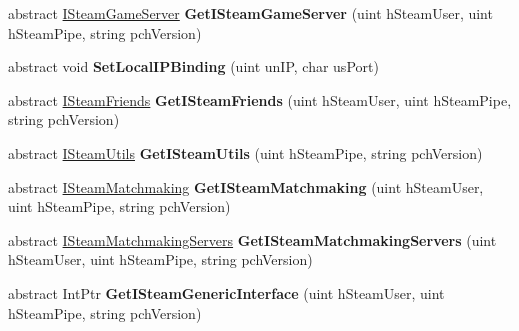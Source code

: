 \begin{DoxyCompactItemize}
abstract \hyperlink{class_valve_1_1_steamworks_1_1_i_steam_game_server}{I\+Steam\+Game\+Server} {\bfseries Get\+I\+Steam\+Game\+Server} (uint h\+Steam\+User, uint h\+Steam\+Pipe, string pch\+Version)
\item 
\mbox{\label{class_valve_1_1_steamworks_1_1_i_steam_client_a5ccf65996877625852645d98caa74cb1}} 
abstract void {\bfseries Set\+Local\+I\+P\+Binding} (uint un\+IP, char us\+Port)
\item 
\mbox{\label{class_valve_1_1_steamworks_1_1_i_steam_client_aca99b7e6173d04b4c1b0f8abda52f0ba}} 
abstract \hyperlink{class_valve_1_1_steamworks_1_1_i_steam_friends}{I\+Steam\+Friends} {\bfseries Get\+I\+Steam\+Friends} (uint h\+Steam\+User, uint h\+Steam\+Pipe, string pch\+Version)
\item 
\mbox{\label{class_valve_1_1_steamworks_1_1_i_steam_client_a8ddb5fe72c521bfcc08c5cb1e61bb83f}} 
abstract \hyperlink{class_valve_1_1_steamworks_1_1_i_steam_utils}{I\+Steam\+Utils} {\bfseries Get\+I\+Steam\+Utils} (uint h\+Steam\+Pipe, string pch\+Version)
\item 
\mbox{\label{class_valve_1_1_steamworks_1_1_i_steam_client_a4131ec4b66dcacf0cdb30059d794ec76}} 
abstract \hyperlink{class_valve_1_1_steamworks_1_1_i_steam_matchmaking}{I\+Steam\+Matchmaking} {\bfseries Get\+I\+Steam\+Matchmaking} (uint h\+Steam\+User, uint h\+Steam\+Pipe, string pch\+Version)
\item 
\mbox{\label{class_valve_1_1_steamworks_1_1_i_steam_client_aaa22ca34bb892e22712f7cebf6f3ecfe}} 
abstract \hyperlink{class_valve_1_1_steamworks_1_1_i_steam_matchmaking_servers}{I\+Steam\+Matchmaking\+Servers} {\bfseries Get\+I\+Steam\+Matchmaking\+Servers} (uint h\+Steam\+User, uint h\+Steam\+Pipe, string pch\+Version)
\item 
\mbox{\label{class_valve_1_1_steamworks_1_1_i_steam_client_aca16fa10d00fbe3e9a73faa221e9bc82}} 
abstract Int\+Ptr {\bfseries Get\+I\+Steam\+Generic\+Interface} (uint h\+Steam\+User, uint h\+Steam\+Pipe, string pch\+Version)
\item 

\end{DoxyCompactItemize}

